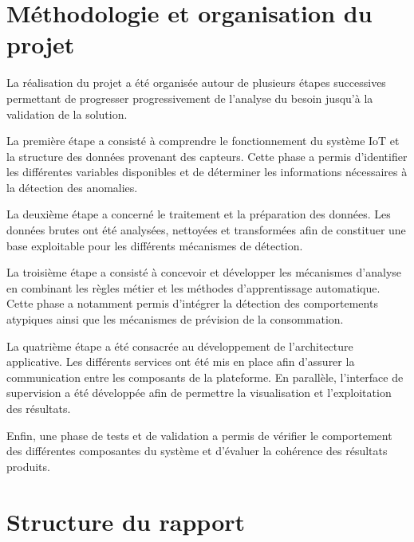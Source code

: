 
\section{Méthodologie et organisation du projet}

La réalisation du projet a été organisée autour de plusieurs étapes
successives permettant de progresser progressivement de l'analyse du besoin
jusqu'à la validation de la solution.

La première étape a consisté à comprendre le fonctionnement du système IoT
et la structure des données provenant des capteurs. Cette phase a permis
d'identifier les différentes variables disponibles et de déterminer les
informations nécessaires à la détection des anomalies.

La deuxième étape a concerné le traitement et la préparation des données.
Les données brutes ont été analysées, nettoyées et transformées afin de
constituer une base exploitable pour les différents mécanismes de détection.

La troisième étape a consisté à concevoir et développer les mécanismes
d'analyse en combinant les règles métier et les méthodes d'apprentissage
automatique. Cette phase a notamment permis d'intégrer la détection des
comportements atypiques ainsi que les mécanismes de prévision de la
consommation.

La quatrième étape a été consacrée au développement de l'architecture
applicative. Les différents services ont été mis en place afin d'assurer
la communication entre les composants de la plateforme. En parallèle,
l'interface de supervision a été développée afin de permettre la
visualisation et l'exploitation des résultats.

Enfin, une phase de tests et de validation a permis de vérifier le
comportement des différentes composantes du système et d'évaluer la
cohérence des résultats produits.


\section{Structure du rapport}

